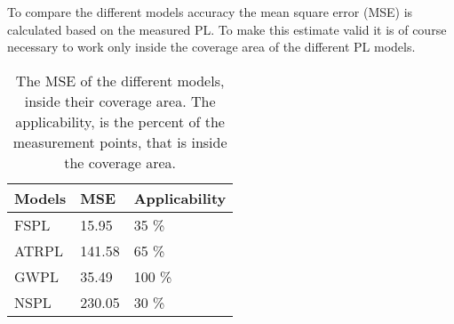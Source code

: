 To compare the different models accuracy the mean square error (MSE) is calculated based on the measured PL. To make this estimate valid it is of course necessary to work only inside the coverage area of the different PL models. 




\begin{table}[!htbp]
\centering
\caption{The MSE of the different models, inside their coverage area. The applicability, is the percent of the measurement points, that is inside the coverage area.}
\label{model_comparison}
\begin{tabular}{|l|l|l|}
\hline
\textbf{Models} & \textbf{MSE} & \textbf{Applicability} \\ \hline
FSPL            & 15.95        & 35 \%                  \\ \hline
ATRPL 		    & 141.58       & 65 \%                  \\ \hline %
GWPL            & 35.49        & 100 \%                 \\ \hline
NSPL            & 230.05       & 30 \%                  \\ \hline
\end{tabular}

\end{table}





